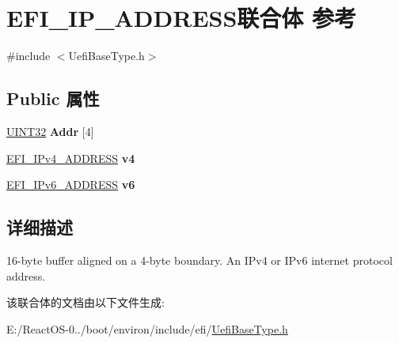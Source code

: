 \hypertarget{union_e_f_i___i_p___a_d_d_r_e_s_s}{}\section{E\+F\+I\+\_\+\+I\+P\+\_\+\+A\+D\+D\+R\+E\+S\+S联合体 参考}
\label{union_e_f_i___i_p___a_d_d_r_e_s_s}


{\ttfamily \#include $<$Uefi\+Base\+Type.\+h$>$}

\subsection*{Public 属性}
\begin{DoxyCompactItemize}
\item 
\mbox{\label{union_e_f_i___i_p___a_d_d_r_e_s_s_a7cb1dd1b958079e7443b52b5d609e7bc}} 
\hyperlink{_processor_bind_8h_ae1e6edbbc26d6fbc71a90190d0266018}{U\+I\+N\+T32} {\bfseries Addr} \mbox{[}4\mbox{]}
\item 
\mbox{\label{union_e_f_i___i_p___a_d_d_r_e_s_s_a6dcc577ceb4798a3340fd1888322c803}} 
\hyperlink{struct_e_f_i___i_pv4___a_d_d_r_e_s_s}{E\+F\+I\+\_\+\+I\+Pv4\+\_\+\+A\+D\+D\+R\+E\+SS} {\bfseries v4}
\item 
\mbox{\label{union_e_f_i___i_p___a_d_d_r_e_s_s_aaad0067c1bcc1fdc776b3a9387a03ead}} 
\hyperlink{struct_e_f_i___i_pv6___a_d_d_r_e_s_s}{E\+F\+I\+\_\+\+I\+Pv6\+\_\+\+A\+D\+D\+R\+E\+SS} {\bfseries v6}
\end{DoxyCompactItemize}


\subsection{详细描述}
16-\/byte buffer aligned on a 4-\/byte boundary. An I\+Pv4 or I\+Pv6 internet protocol address. 

该联合体的文档由以下文件生成\+:\begin{DoxyCompactItemize}
\item 
E\+:/\+React\+O\+S-\/0../boot/environ/include/efi/\hyperlink{_uefi_base_type_8h}{Uefi\+Base\+Type.\+h}\end{DoxyCompactItemize}
